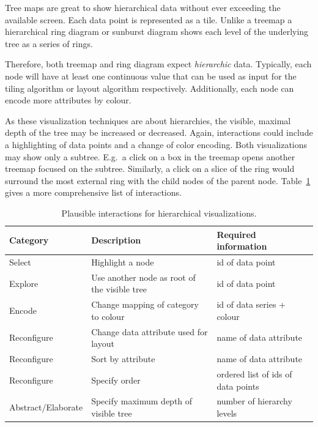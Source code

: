 Tree maps are great to show hierarchical data without ever exceeding the available screen.
Each data point is represented as a tile.
Unlike a treemap a hierarchical ring diagram or sunburst diagram shows each level of the underlying tree as a series of rings.

Therefore, both treemap and ring diagram expect \emph{hierarchic} data.
Typically, each node will have at least one continuous value that can be used as input for the tiling algorithm or layout algorithm respectively.
Additionally, each node can encode more attributes by colour.

As these visualization techniques are about hierarchies, the visible, maximal depth of the tree may be increased or decreased.
Again, interactions could include a highlighting of data points and a change of color encoding.
Both visualizations may show only a subtree.
E.g.\ a click on a box in the treemap opens another treemap focused on the subtree.
Similarly, a click on a slice of the ring would surround the most external ring with the child nodes of the parent node.
Table~\ref{tab:analysis:hierarchies:interactions} gives a more comprehensive list of interactions.


\begin{table}[H]
  \caption{Plausible interactions for hierarchical visualizations.}%
  \label{tab:analysis:hierarchies:interactions}
  \begin{tabularx}{\linewidth}{lXX}
    \bf Category & \bf Description & \bf Required information \\
    \hline
    Select & Highlight a node & id of data point \\
    Explore & Use another node as root of the visible tree & id of data point \\
    Encode & Change mapping of category to colour & id of data series + colour \\
    Reconfigure & Change data attribute used for layout & name of data attribute \\
    Reconfigure & Sort by attribute & name of data attribute \\
    Reconfigure & Specify order & ordered list of ids of data points \\
    Abstract/Elaborate & Specify maximum depth of visible tree & number of hierarchy levels \\
  \end{tabularx}
\end{table}

